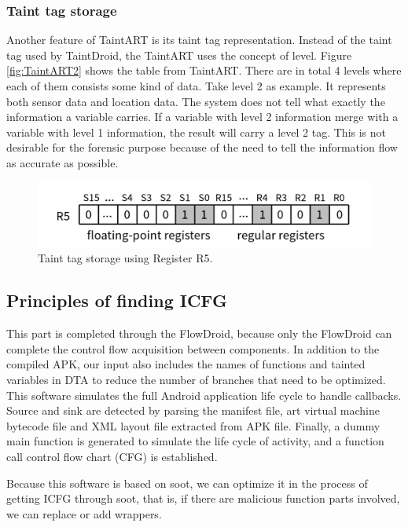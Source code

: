 \documentclass{article}
\begin{document}
\subsubsection{Taint tag storage}
Another feature of TaintART is its taint tag representation. Instead of the taint tag used by TaintDroid, the TaintART uses the concept of level. Figure \ref{fig:TaintART2} shows the table from TaintART. There are in total 4 levels where each of them consists some kind of data. Take level 2 as example. It represents both sensor data and location data. The system does not tell what exactly the information a variable carries. If a variable with level 2 information merge with a variable with level 1 information, the result will carry a level 2 tag. This is not desirable for the forensic purpose because of the need to tell the information flow as accurate as possible.

\begin{figure}[ht]
  \centering
  \includegraphics[scale=0.4]{TaintART5.png}
  \caption{Taint tag storage using Register R5.}
  \label{fig:TaintART5}
\end{figure}


\subsection{Principles of finding ICFG}
This part is completed through the FlowDroid, because only the FlowDroid can complete the control flow acquisition between components. In addition to the compiled APK, our input also includes the names of functions and tainted variables in DTA to reduce the number of branches that need to be optimized. This software simulates the full Android application life cycle to handle callbacks. Source and sink are detected by parsing the manifest file, art virtual machine bytecode file and XML layout file extracted from APK file. Finally, a dummy main function is generated to simulate the life cycle of activity, and a function call control flow chart (CFG) is established.

Because this software is based on soot, we can optimize it in the process of getting ICFG through soot, that is, if there are malicious function parts involved, we can replace or add wrappers.
\end{document}

